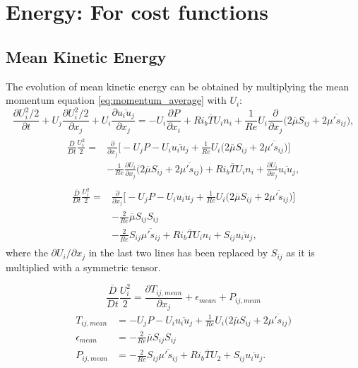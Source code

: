 \documentclass[preprint,12pt]{article}
\begin{document}
\section{Energy: For cost functions}

\subsection{Mean Kinetic Energy}
The evolution of mean kinetic energy can be obtained by multiplying the mean momentum equation \eqref{eq:momentum_average} with $U_i$:
\begin{equation}\label{eq:energy_average}
\frac{\partial {U_i^2/2}}{\partial t}+U_j\frac{\partial U_i^2/2}{\partial x_j}+U_i{\frac{\partial \overline{u_iu_j}}{\partial x_j}}=-U_i\frac{\partial P}{\partial x_i}+{Ri_b\overline{T}}U_i n_i+{\frac{1}{Re}}U_i\frac{\partial}{\partial x_j}\Big(2{\overline{\mu}}S_{ij}+2\overline{{\mu}'s_{ij}}\Big),
\end{equation}
\begin{align}\begin{split}
\frac{\overline{D}}{Dt}\frac{U_i^2}{2}=&\frac{\partial}{\partial x_j}\Big[-U_jP-U_i\overline{u_iu_j}+\frac{1}{Re}U_i\Big(2{\overline{\mu}}S_{ij}+2\overline{{\mu}'s_{ij}}\Big)\Big]\\&-\frac{1}{Re}\frac{\partial U_i}{\partial x_j}\Big(2{\overline{\mu}}S_{ij}+2\overline{{\mu}'s_{ij}}\Big)+{Ri_b\overline{T}}U_i n_i+\frac{\partial U_i}{\partial x_j} \overline{u_iu_j},
\end{split}
\end{align}
\begin{align}\begin{split}
\frac{\overline{D}}{Dt}\frac{U_i^2}{2}=&\frac{\partial}{\partial x_j}\Big[-U_jP-U_i\overline{u_iu_j}+\frac{1}{Re}U_i\Big(2{\overline{\mu}}S_{ij}+2\overline{{\mu}'s_{ij}}\Big)\Big]\\&-\frac{2}{Re}{\overline{\mu}}S_{ij}S_{ij}\\&-\frac{2}{Re}S_{ij}\overline{{\mu}'s_{ij}}+{Ri_b\overline{T}}U_i n_i+S_{ij}\overline{u_iu_j},
\end{split}
\end{align}
where the $\partial U_i/\partial x_j$ in the last two lines has been replaced by $S_{ij}$ as it is multiplied with a symmetric tensor.
\begin{tcolorbox}
\begin{equation}\label{eq:Mean_Energy_1}
\frac{\overline{D}}{Dt}\frac{U_i^2}{2}=\frac{\partial T_{ij,mean}}{\partial x_j}+\epsilon_{mean}+P_{ij,mean}
\end{equation}
\begin{align}
T_{ij,mean}&=-U_jP-U_i\overline{u_iu_j}+\frac{1}{Re}U_i\Big(2{\overline{\mu}}S_{ij}+2\overline{{\mu}'s_{ij}}\Big)\label{eq:Mean_Energy_2}\\
\epsilon_{mean}&=-\frac{2}{Re}{\overline{\mu}}S_{ij}S_{ij}\label{eq:Mean_Energy_3}\\
P_{ij,mean}&=-\frac{2}{Re}S_{ij}\overline{{\mu}'s_{ij}}+{Ri_b\overline{T}}U_2 +S_{ij}\overline{u_iu_j}.\label{eq:Mean_Energy_4}
\end{align}
\end{tcolorbox}
\end{document}

